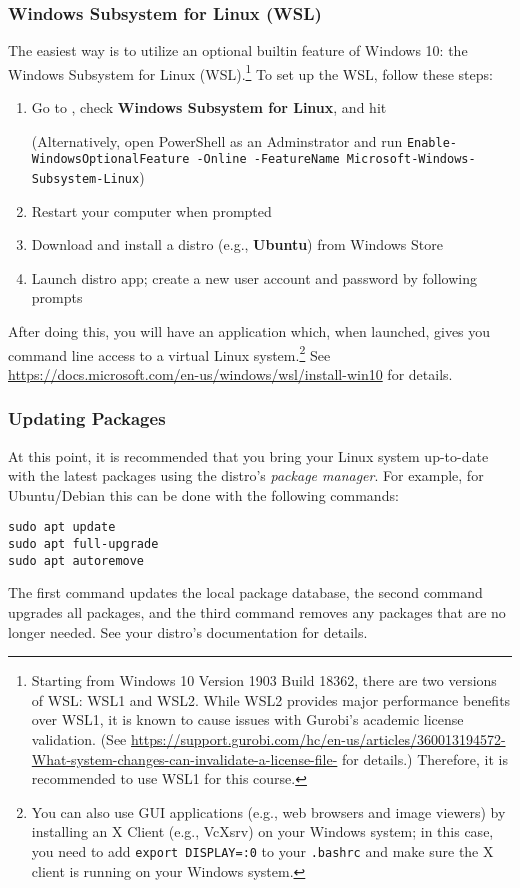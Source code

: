 \documentclass[12pt]{article}
\begin{document}
\subsubsection{Windows Subsystem for Linux (WSL)} \label{sec:wsl}
The easiest way is to utilize an optional builtin feature of Windows 10: the Windows Subsystem for Linux (WSL).\footnote{
    Starting from Windows 10 Version 1903 Build 18362, there are two versions of WSL: WSL1 and WSL2.
    While WSL2 provides major performance benefits over WSL1, it is known to cause issues with Gurobi's academic license validation.
    (See \url{https://support.gurobi.com/hc/en-us/articles/360013194572-What-system-changes-can-invalidate-a-license-file-} for details.)
    Therefore, it is recommended to use WSL1 for this course.
}
To set up the WSL, follow these steps:
\begin{enumerate}
    \item Go to , check \textbf{Windows Subsystem for Linux}, and hit 

        (Alternatively, open PowerShell as an Adminstrator and run \texttt{Enable-WindowsOptionalFeature -Online -FeatureName Microsoft-Windows-Subsystem-Linux})
    \item Restart your computer when prompted
    \item Download and install a distro (e.g., \textbf{Ubuntu}) from Windows Store
    \item Launch distro app; create a new user account and password by following prompts
\end{enumerate}
After doing this, you will have an application which, when launched, gives you command line access to a virtual Linux system.\footnote{
    You can also use GUI applications (e.g., web browsers and image viewers) by installing an X Client (e.g., VcXsrv) on your Windows system; in this case, you need to add \texttt{export DISPLAY=:0} to your \texttt{.bashrc} and make sure the X client is running on your Windows system.
}
See \url{https://docs.microsoft.com/en-us/windows/wsl/install-win10} for details.

\subsubsection{Updating Packages}
At this point, it is recommended that you bring your Linux system up-to-date with the latest packages using the distro's \emph{package manager}.
For example, for Ubuntu/Debian this can be done with the following commands:
\begin{verbatim}
sudo apt update
sudo apt full-upgrade
sudo apt autoremove
\end{verbatim}
The first command updates the local package database, the second command upgrades all packages, and the third command removes any packages that are no longer needed.
See your distro's documentation for details.
\end{document}
